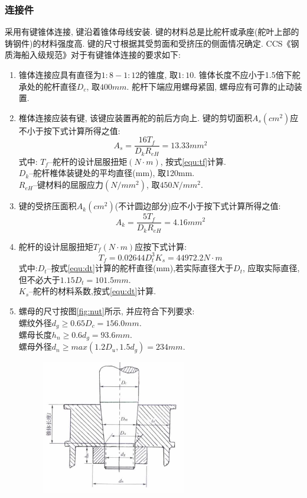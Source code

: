 \documentclass[a4paper,UTF8]{article}
\begin{document}
\subsubsection{连接件}
采用有键锥体连接, 键沿着锥体母线安装. 键的材料总是比舵杆或承座(舵叶上部的铸钢件)的材料强度高. 键的尺寸根据其受剪面和受挤压的侧面情况确定. CCS《钢质海船入级规范》对于有键锥体连接的要求如下:
\begin{enumerate}
	\item 锥体连接应具有直径为$1:8-1:12$的锥度, 取$1:10$. 锥体长度不应小于1.5倍下舵承处的舵杆直径$D_{c}$, 取$400mm$. 舵杆下端应用螺母紧固, 螺母应有可靠的止动装置.
	\item 椎体连接应装有键, 该键应装置再舵的前后方向上. 键的剪切面积$A_{s}(cm^2)$应不小于按下式计算所得之值:
		\begin{equation}
			A_{s}=\frac{16T_{f}}{D_{k}R_{eH}}=13.33mm^2
		\end{equation}
		式中: $T_{f}$--舵杆的设计屈服扭矩$(N\cdot m)$, 按式\ref{equ:tf}计算.\\
			  $D_{k}$--舵杆椎体装键处的平均直径(mm), 取120mm.\\
			  $R_{eH}$--键材料的屈服应力$(N/mm^2)$, 取$450N/mm^2$.\\
	\item 键的受挤压面积$A_{k}(cm^2)$(不计圆边部分)应不小于按下式计算所得之值:
		\begin{equation}
			A_{k}=\frac{5T_{f}}{D_{k}R_{eH}}=4.16mm^2
		\end{equation}
	\item 舵杆的设计屈服扭矩$T_{f}(N\cdot m)$应按下式计算:
		\begin{equation}\label{equ:tf}
			T_{f}=0.02644D_{t}^3K_{s}=44972.2N\cdot m
		\end{equation}
		式中:$D_{t}$--按式\ref{equ:dt}计算的舵杆直径(mm),若实际直径大于$D_{t}$, 应取实际直径, 但不必大于$1.15D_{t}=101.5mm$.\\
		$K_{s}$--舵杆的材料系数,按式\ref{equ:dt}计算.\\
	\item 螺母的尺寸按图\ref{fig:nut}所示, 并应符合下列要求:\\
		螺纹外径$d_{g}\geq0.65D_{c}=156.0mm$.\\
		螺母长度$h_{n}\geq0.6d_{g}=93.6mm$.\\
		螺母外径$d_{n}\geq max(1.2D_{u}, 1.5d_{g})=234mm$.
		\begin{figure}
			\centering
			\includegraphics[width=2.5in]{figure/nut}

\end{figure}
\end{enumerate}
\end{document}
